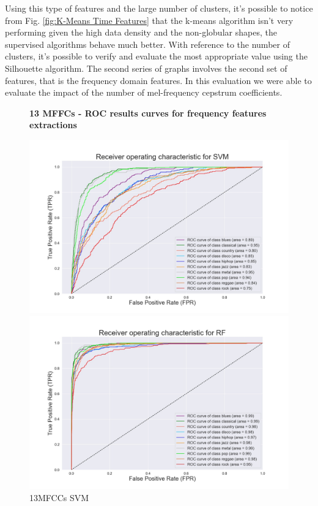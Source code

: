 \documentclass[conference]{IEEEtran}
\begin{document}
\noindent
Using this type of features and the large number of clusters, it's possible to notice from Fig. \ref{fig:K-Means Time Features} that the k-means algorithm isn't very performing given the high data density and the non-globular shapes, the supervised algorithms behave much better. With reference to the number of clusters, it's possible to verify and evaluate the most appropriate value using the Silhouette algorithm. The second series of graphs involves the second set of features, that is the frequency domain features. In this evaluation we were able to evaluate the impact of the number of mel-frequency cepstrum coefficients.

\begin{figure}[!ht]
    \begin{center}
        \small\textbf{13 MFFCs - ROC results curves for frequency features extractions}\par\medskip    
        \begin{minipage}[t]{.24\textwidth}
            \centering
            \includegraphics[width=\textwidth]{plot/SL/frequency_features/13/SVM_13MFCC_10000_10GEN_GTZAN - ROC Plot.jpg}
            \caption{13MFCCs SVM}
            \label{fig:13MFCCs SVM Frequency Features}
        \end{minipage}
        \begin{minipage}[t]{.24\textwidth}
            \centering
            \includegraphics[width=\textwidth]{plot/SL/frequency_features/13/RF_13MFCC_10000_10GEN_GTZAN - ROC Plot.jpg}

\end{minipage}
\end{center}
\end{figure}
\end{document}
